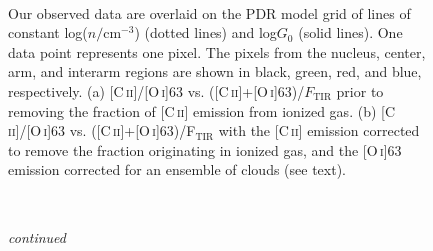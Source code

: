 \begin{figure}[!htbp]
 \\
\caption[Comparisons of observed line ratios in M51 with a PDR model grid using the uncorrected and corrected observations]{Our observed data are overlaid on the PDR model grid of lines of constant log($n/\mathrm{cm}^{-3}$) (dotted lines) and log$G_0$ (solid lines).  One data point represents one pixel.  The pixels from the nucleus, center, arm, and interarm regions are shown in black, green, red, and blue, respectively.  (a) [C\,\textsc{ii}]/[O\,\textsc{i}]63 vs. ([C\,\textsc{ii}]+[O\,\textsc{i}]63)/$F_{\mathrm{TIR}}$ prior to removing the fraction of [C\,\textsc{ii}] emission from ionized gas. (b) [C\,\textsc{ii}]/[O\,\textsc{i}]63 vs. ([C\,\textsc{ii}]+[O\,\textsc{i}]63)/F$_{\mathrm{TIR}}$ with the [C\,\textsc{ii}] emission corrected to remove the fraction originating in ionized gas, and the [O\,\textsc{i}]63 emission corrected for an ensemble of clouds (see text).}
\label{fig:CIIonOIvsCIIOIonLfir}
\end{figure}
\begin{figure}[!htbp]
\ContinuedFloat
{}\\
\caption[]{\emph{continued}}
\end{figure}

